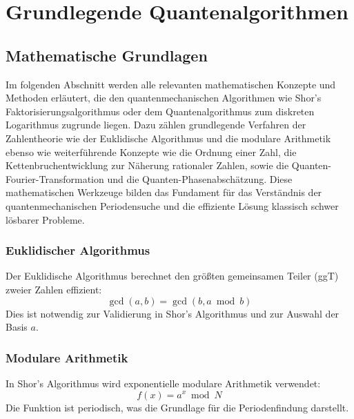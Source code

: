 \chapter{Grundlegende Quantenalgorithmen}
\label{basic_algorithms} %




\section{Mathematische Grundlagen}

\noindent Im folgenden Abschnitt werden alle relevanten mathematischen Konzepte und Methoden erläutert, die den quantenmechanischen Algorithmen wie Shor's Faktorisierungsalgorithmus oder dem Quantenalgorithmus zum diskreten Logarithmus zugrunde liegen. Dazu zählen grundlegende Verfahren der Zahlentheorie wie der Euklidische Algorithmus und die modulare Arithmetik ebenso wie weiterführende Konzepte wie die Ordnung einer Zahl, die Kettenbruchentwicklung zur Näherung rationaler Zahlen, sowie die Quanten-Fourier-Transformation und die Quanten-Phasenabschätzung. Diese mathematischen Werkzeuge bilden das Fundament für das Verständnis der quantenmechanischen Periodensuche und die effiziente Lösung klassisch schwer lösbarer Probleme.

\subsection{Euklidischer Algorithmus}
Der Euklidische Algorithmus berechnet den größten gemeinsamen Teiler (ggT) zweier Zahlen effizient:
\[
\gcd(a, b) = \gcd(b, a \bmod b)
\]
Dies ist notwendig zur Validierung in Shor's Algorithmus und zur Auswahl der Basis \( a \).

\subsection{Modulare Arithmetik}
In Shor's Algorithmus wird exponentielle modulare Arithmetik verwendet:
\[
f(x) = a^x \bmod N
\]
Die Funktion ist periodisch, was die Grundlage für die Periodenfindung darstellt.

